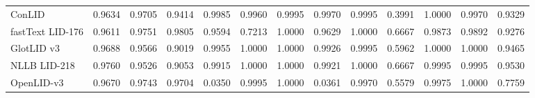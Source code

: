 \documentclass[11pt]{article}
\begin{document}
\begin{table}[p]
\begin{tabular}{l ccc cccccccc c}
ConLID & 0.9634 & 0.9705 & 0.9414 & 0.9985 & 0.9960 & 0.9995 & 0.9970 & 0.9995 & 0.3991 & 1.0000 & 0.9970 & 0.9329 \\
fastText LID-176 & 0.9611 & 0.9751 & 0.9805 & 0.9594 & 0.7213 & 1.0000 & 0.9629 & 1.0000 & 0.6667 & 0.9873 & 0.9892 & 0.9276 \\
GlotLID v3 & 0.9688 & 0.9566 & 0.9019 & 0.9955 & 1.0000 & 1.0000 & 0.9926 & 0.9995 & 0.5962 & 1.0000 & 1.0000 & 0.9465 \\
NLLB LID-218 & 0.9760 & 0.9526 & 0.9053 & 0.9915 & 1.0000 & 1.0000 & 0.9921 & 1.0000 & 0.6667 & 0.9995 & 0.9995 & 0.9530 \\
OpenLID-v3 & 0.9670 & 0.9743 & 0.9704 & 0.0350 & 0.9995 & 1.0000 & 0.0361 & 0.9970 & 0.5579 & 0.9975 & 1.0000 & 0.7759 \\
\bottomrule
\end{tabular}

\vspace{12pt}


\end{table}
\end{document}
